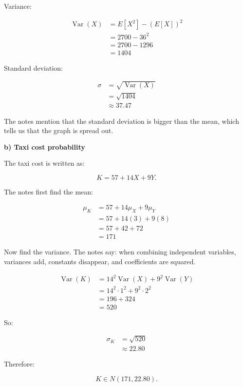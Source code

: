 \documentclass[10pt]{article}
\begin{document}
Variance:

\begin{align*}
\operatorname{Var}(X)
&=
E[X^2]-(E[X])^2 \\[2mm]
&=
2700-36^2 \\[2mm]
&=
2700-1296 \\[2mm]
&=1404
\end{align*}

Standard deviation:

\begin{align*}
\sigma
&=
\sqrt{\operatorname{Var}(X)} \\[2mm]
&=
\sqrt{1404} \\[2mm]
&\approx 37.47
\end{align*}

The notes mention that the standard deviation is bigger than
the mean, which tells us that the graph is spread out.

\RepeatedQuestion{\uppgiftFourQuestion}
\textbf{b) Taxi cost probability}

The taxi cost is written as:

\[
K=57+14X+9Y.
\]

The notes first find the mean:

\begin{align*}
\mu_K
&=
57+14\mu_X+9\mu_Y \\[2mm]
&=
57+14(3)+9(8) \\[2mm]
&=
57+42+72 \\[2mm]
&=171
\end{align*}

Now find the variance.
The notes say:
when combining independent variables, variances add,
constants disappear, and coefficients are squared.

\begin{align*}
\operatorname{Var}(K)
&=
14^2\operatorname{Var}(X)
+9^2\operatorname{Var}(Y) \\[2mm]
&=
14^2\cdot 1^2
+9^2\cdot 2^2 \\[2mm]
&=
196+324 \\[2mm]
&=520
\end{align*}

So:

\begin{align*}
\sigma_K
&=
\sqrt{520} \\[2mm]
&\approx 22.80
\end{align*}

Therefore:

\[
K\in N(171,22.80).
\]
\end{document}

